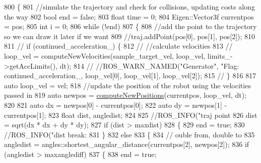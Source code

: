 \begin{DoxyCode}
800         \{
801             \textcolor{comment}{//simulate the trajectory and check for collisions, updating costs along the way}
802             \textcolor{keywordtype}{bool} end = \textcolor{keyword}{false};
803             \textcolor{keywordtype}{float} time = 0;
804             Eigen::Vector3f currentpos = pos;
805             \textcolor{keywordtype}{int} i = 0;
806             \textcolor{keywordflow}{while} (!end)
807             \{
808                 \textcolor{comment}{//add the point to the trajectory so we can draw it later if we want}
809                 \textcolor{comment}{//traj.addPoint(pos[0], pos[1], pos[2]);}
810 
811                 \textcolor{comment}{// if (continued\_acceleration\_) \{}
812                 \textcolor{comment}{//   //calculate velocities}
813                 \textcolor{comment}{//   loop\_vel = computeNewVelocities(sample\_target\_vel, loop\_vel, limits\_->getAccLimits(),
       dt);}
814                 \textcolor{comment}{//   //ROS\_WARN\_NAMED("Generator", "Flag: %
       continued\_acceleration\_, loop\_vel[0], loop\_vel[1], loop\_vel[2]);}
815                 \textcolor{comment}{// \}}
816 
817                 \textcolor{keyword}{auto} loop\_vel = vel;
818                 \textcolor{comment}{//update the position of the robot using the velocities passed in}
819                 \textcolor{keyword}{auto} newpos = \hyperlink{classcl__move__base__z_1_1backward__local__planner_1_1BackwardLocalPlanner_a0fe2ebd23fd79e8b574127e819ef0e14}{computeNewPositions}(currentpos, loop\_vel, dt);
820 
821                 \textcolor{keyword}{auto} dx = newpos[0] - currentpos[0];
822                 \textcolor{keyword}{auto} dy = newpos[1] - currentpos[1];
823                 \textcolor{keywordtype}{float} dist, angledist;
824 
825                 \textcolor{comment}{//ROS\_INFO("traj point %
826                 dist = sqrt(dx * dx + dy * dy);
827                 \textcolor{keywordflow}{if} (dist > maxdist)
828                 \{
829                     end = \textcolor{keyword}{true};
830                     \textcolor{comment}{//ROS\_INFO("dist break: %
831                 \}
832                 \textcolor{keywordflow}{else}
833                 \{
834                     \textcolor{comment}{// ouble from, double to}
835                     angledist = angles::shortest\_angular\_distance(currentpos[2], newpos[2]);
836                     \textcolor{keywordflow}{if} (angledist > maxanglediff)
837                     \{
838                         end = \textcolor{keyword}{true};
}}
\end{DoxyCode}
